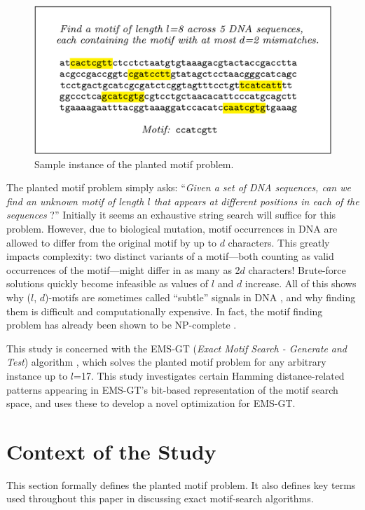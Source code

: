 \documentclass[oneside,12pt]{DISCSthesis}
\begin{document}
		\begin{figure}[h] \label{fig:example}
			\centering
			\includegraphics[width=5.5in]{img/example}
			\caption{Sample instance of the planted motif problem.}
			\end{figure}

		The planted motif problem simply asks: ``\emph{Given a set of DNA sequences, can we find an unknown motif of length $l$ that appears at different positions in each of the sequences} \cite{pevzner2000combinatorial}?'' Initially it seems an exhaustive string search will suffice for this problem. However, due to biological mutation, motif occurrences in DNA are allowed to differ from the original motif by up to $d$ characters. This greatly impacts complexity: two distinct variants of a motif---both counting as valid occurrences of the motif---might differ in as many as 2$d$ characters! Brute-force solutions quickly become infeasible as values of $l$ and $d$ increase. All of this shows why ($l$, $d$)-motifs are sometimes called ``subtle'' signals in DNA  \cite{pevzner2000combinatorial}, and why finding them is difficult and computationally expensive. In fact, the motif finding problem has already been shown to be NP-complete \cite{pms2014}. 

		This study is concerned with the EMS-GT (\emph{Exact Motif Search - Generate and Test}) algorithm \cite{nabos2015dissertation}, which solves the planted motif problem for any arbitrary instance up to $l$=17. This study investigates certain Hamming distance-related patterns appearing in EMS-GT's bit-based representation of the motif search space, and uses these to develop a novel optimization for EMS-GT.

	\section{Context of the Study}
		This section formally defines the planted motif problem. It also defines key terms used throughout this paper in discussing exact motif-search algorithms.
\end{document}
